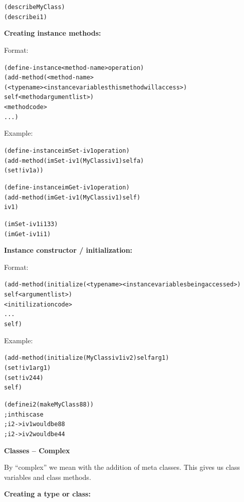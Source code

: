 \documentclass[12pt]{article}
\begin{document}
\begin{alltt}
   (describe MyClass)
   (describe i1)
\end{alltt}


\textbf{Creating instance methods:}

Format:

\begin{alltt}
   (define-instance <method-name> operation)
   (add-method (<method-name>
                     (<type name>  <instance variables this method will access>)
                     self  <method argument list>)
               <method code>
               ...)
\end{alltt}

\newpage

Example:

\begin{alltt}
   (define-instance imSet-iv1 operation)
   (add-method (imSet-iv1 (MyClass iv1) self a)
               (set! iv1 a))
  
   (define-instance imGet-iv1 operation)
   (add-method (imGet-iv1 (MyClass iv1) self)
               iv1)

   (imSet-iv1 i1 33)
   (imGet-iv1 i1)
\end{alltt}


\textbf{Instance constructor / initialization:}

Format:

\begin{alltt}
   (add-method (initialize  (<type name>  <instance variables being accessed>)
                            self  <argument list>)
                     <initilization code>
                     ...
                     self)
\end{alltt}

Example:

\begin{alltt}
   (add-method (initialize (MyClass iv1 iv2) self arg1)
        (set! iv1 arg1)
        (set! iv2 44)
        self)

    (define i2 (make MyClass 88))
    ; in this case
    ; i2->iv1 would be 88
    ; i2->iv2 would be 44
\end{alltt}

\newpage

{\large \bfseries Classes -- Complex}

By ``complex'' we mean with the addition of meta classes.  This gives us class variables and class methods.

\textbf{Creating a type or class:}
\end{document}
